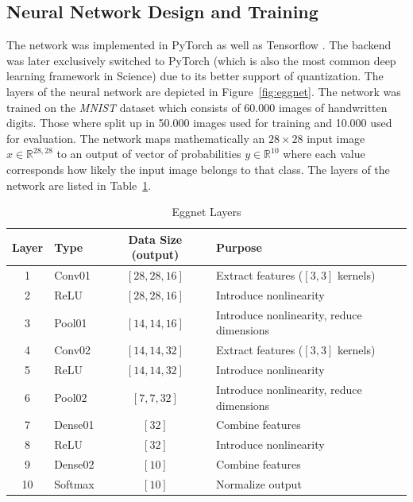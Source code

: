\subsection{Neural Network Design and Training}
\label{subsec:nntraining}



The network was implemented in PyTorch \cite{Paszke:2019aa} as well as Tensorflow \cite{MartinAbadi:2015aa}. The backend was later exclusively switched to PyTorch (which is also the most common deep learning framework in Science) due to its better support of quantization. The layers of the neural network are depicted in Figure~\ref{fig:eggnet}. 
The network was trained on the \emph{MNIST} dataset which consists of 60.000 images of handwritten digits. Those where split up in 50.000 images used for training and 10.000 used for evaluation. The network maps mathematically an $28 \times 28$ input image $x \in \mathbb{R}^{28,28}$ to an output of vector of probabilities $y \in \mathbb{R}^{10}$ where each value corresponds how likely the input image belongs to that class. The layers of the network are listed in Table~\ref{tab:eggnet-layers}.

\begin{table}[h]
	\centering
	\begin{tabular}{clcl}
		\toprule
		Layer & Type	& 	Data Size (output)	& Purpose \\
		\midrule
		 1 & Conv01		&	$[28,28,16]$	& Extract features ($[3,3]$ kernels)		  \\
		 2 & ReLU		&	$[28,28,16]$	& Introduce nonlinearity  \\
		 3 & Pool01		&	$[14,14,16]$	& Introduce nonlinearity, reduce dimensions  \\
		 4 & Conv02 	&	$[14,14,32]$	& Extract features 	($[3,3]$ kernels)	  \\
		 5 & ReLU		&	$[14,14,32]$	& Introduce nonlinearity  \\
		 6 & Pool02		&	$[7,7,32]$	& Introduce nonlinearity, reduce dimensions  \\
		 7 & Dense01	&	$[32]$		& Combine features  \\
		 8 & ReLU		&	$[32]$		& Introduce nonlinearity  \\
		 9 & Dense02	&	$[10]$		& Combine features  \\
		10 & Softmax 	&	$[10]$		& Normalize output  \\
		\bottomrule
	\end{tabular}
	\caption{Eggnet Layers}
	\label{tab:eggnet-layers}
\end{table}

